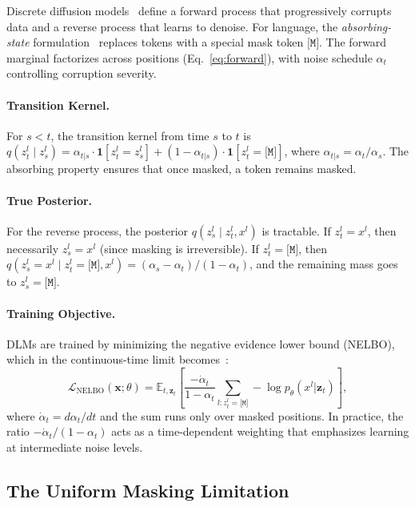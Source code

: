 \documentclass[11pt]{article}
\newcommand{\gL}{\mathcal{L}}
\newcommand{\rvx}{\mathbf{x}}
\newcommand{\rvz}{\mathbf{z}}
\newcommand{\ind}{\mathbf{1}}
\newcommand{\E}{\mathbb{E}}
\theoremstyle{remark}
\begin{document}
Discrete diffusion models~\citep{sohl2015deep,d3pm} define a forward process that progressively corrupts data and a reverse process that learns to denoise. For language, the \textit{absorbing-state} formulation~\citep{d3pm,mdlm} replaces tokens with a special mask token $\texttt{[M]}$. The forward marginal factorizes across positions (Eq.~\ref{eq:forward}), with noise schedule $\alpha_t$ controlling corruption severity.

\paragraph{Transition Kernel.} For $s < t$, the transition kernel from time $s$ to $t$ is $q(z_t^l \mid z_s^l) = \alpha_{t|s} \cdot \ind[z_t^l = z_s^l] + (1{-}\alpha_{t|s}) \cdot \ind[z_t^l = \texttt{[M]}]$, where $\alpha_{t|s} = \alpha_t / \alpha_s$. The absorbing property ensures that once masked, a token remains masked.

\paragraph{True Posterior.} For the reverse process, the posterior $q(z_s^l \mid z_t^l, x^l)$ is tractable. If $z_t^l = x^l$, then necessarily $z_s^l = x^l$ (since masking is irreversible). If $z_t^l = \texttt{[M]}$, then $q(z_s^l = x^l \mid z_t^l = \texttt{[M]}, x^l) = (\alpha_s - \alpha_t)/(1 - \alpha_t)$, and the remaining mass goes to $z_s^l = \texttt{[M]}$.

\paragraph{Training Objective.} DLMs are trained by minimizing the negative evidence lower bound (NELBO), which in the continuous-time limit becomes~\citep{campbell2022continuous,mdlm}:
\begin{equation}
    \gL_{\text{NELBO}}(\rvx;\theta) = \E_{t,\rvz_t} \!\left[\frac{-\dot{\alpha}_t}{1{-}\alpha_t}\!\sum_{l:z_t^l=\texttt{[M]}} \!\!-\log p_\theta(x^l|\rvz_t)\right],
    \label{eq:nelbo}
\end{equation}
where $\dot{\alpha}_t = d\alpha_t/dt$ and the sum runs only over masked positions. In practice, the ratio $-\dot{\alpha}_t/(1{-}\alpha_t)$ acts as a time-dependent weighting that emphasizes learning at intermediate noise levels.

\subsection{The Uniform Masking Limitation}
\end{document}

